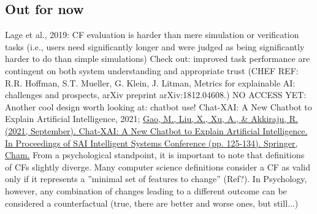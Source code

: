 \subsection{Out for now}
\textcolor{ACMDarkBlue}{
Lage et al., 2019: CF evaluation is harder than mere simulation or verification tasks (i.e., users need significantly longer and were judged as being significantly harder to do than simple simulations)
} 
\textcolor{ACMDarkBlue}{
Check out: improved task performance are contingent on both system understanding and appropriate trust (CHEF REF: R.R. Hoffman, S.T. Mueller, G. Klein, J. Litman, Metrics for explainable AI: challenges and prospects, arXiv preprint arXiv:1812.04608.)
} 
\textcolor{ACMDarkBlue}{
NO ACCESS YET: Another cool design worth looking at: chatbot use! Chat-XAI: A New Chatbot to Explain Artificial Intelligence, 2021; \url{Gao, M., Liu, X., Xu, A., \& Akkiraju, R. (2021, September). Chat-XAI: A New Chatbot to Explain Artificial Intelligence. In Proceedings of SAI Intelligent Systems Conference (pp. 125-134). Springer, Cham.}
}  
\textcolor{ACMDarkBlue}{
From a psychological standpoint, it is important to note that definitions of CFs slightly diverge. Many computer science definitions consider a CF as valid only if it represents a ''minimal set of features to change'' (Ref?). In Psychology, however, any combination of changes leading to a different outcome can be considered a counterfactual (true, there are better and worse ones, but still...)
} 
